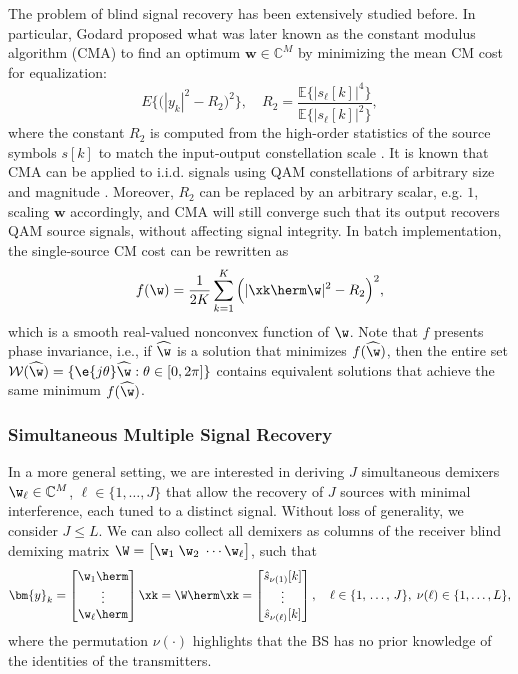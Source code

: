 The problem of blind signal recovery has been extensively studied before. In particular, Godard \cite{Godard1980cma} proposed what was later known \cite{Treichler1985} as the constant modulus algorithm (CMA) to find an optimum $\bm{{w}}\in\mathbb{C}^M$ by minimizing the mean CM cost for equalization:
\begin{equation}
	E\Big\{ \big(|y_k|^2 -R_2\big)^2\Big\}, \quad 
	R_2 = \frac{\mathbb{E}\{|s_\ell[k]|^4\}}{\mathbb{E}\{|s_\ell[k]|^2\}}, \label{system:eqn:cma_ssr_expectation}
\end{equation}
where the constant $R_2$ is computed from the high-order statistics of the source symbols $s[k]$ to match the input-output constellation scale \cite{Godard1980cma}.
It is known that CMA can be applied to i.i.d. signals using QAM constellations of arbitrary size and magnitude \cite{Ding2000}. 
Moreover, $R_2$ can be replaced by an arbitrary scalar, e.g. $1$, scaling $\bm{w}$ accordingly, and CMA will still converge such that its output recovers QAM source signals, without affecting signal integrity. 
In batch implementation, the single-source CM cost can be rewritten as 
\begin{equation}
	f(\w)=
	\displaystyle{\frac{1}{2K}\sum_{k=1}^K\Big(|\xk\herm\w|^2-R_2\Big)^2},
	\label{system:eqn:cma_ssr}
\end{equation}
which is a smooth real-valued nonconvex function of $\w$. 
Note that $f$ presents phase invariance, i.e., if $\widehat{\w}$ is a solution that minimizes $f(\widehat{\w})$, then the entire set $\mathcal{W}({\widehat\w})=\{\e{j\theta}\widehat{\w}: \theta\in[0,2\pi]\}$ 
contains equivalent solutions that achieve the same minimum $f(\widehat{\w})$. 


\subsubsection{Simultaneous Multiple Signal Recovery}
In a more general setting, we are interested in deriving $J$ simultaneous demixers $\w_{\ell}\in\mathbb{C}^M$, $\ell\in\{1,\ldots,J\}$ that allow the recovery of $J$ sources with minimal interference, each tuned to a distinct signal. Without loss of generality, we consider $J\le L$.
We can also collect all demixers as columns of the receiver blind demixing matrix $\W=\big[\w_1\; \w_2\; \cdots \w_{\ell}\big]$, such that
\begin{equation}
	\bm{y}_{k}=\begin{bmatrix}
		\w_1\herm\\
		\vdots\\
		\w_{\ell}\herm\\
	\end{bmatrix}
	\xk= \W\herm \xk=
	\begin{bmatrix}
		\hat{s}_{\nu(1)}[k]\\
		\vdots\\
		\hat{s}_{\nu(\ell)}[k]\end{bmatrix},\quad
	\ell\in\{1,\,\ldots,\, J\},\;\nu(\ell)\in\{1,\ldots,L\}, \label{system:eqn:msr_demixer_output}
\end{equation}
where the permutation $\nu(\cdot)$ highlights that the BS has no prior knowledge of the identities of the transmitters.

